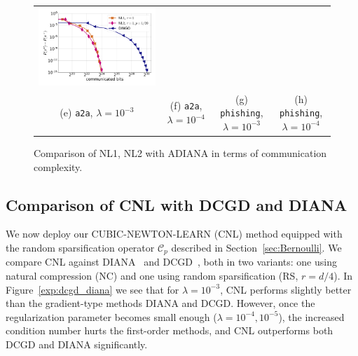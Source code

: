 \documentclass[12pt]{article}
\newcommand{\cC}{{\mathcal{C}}}
\begin{document}
\begin{figure}[ht]
\begin{center}
{\begin{tabular}{cccc}
				\includegraphics[width = 0.23 \textwidth]{LogReg/phishing/Lambda=1e-4/phishing_nl1_nl2_dingo_lmb=0.0001.pdf}
				\\
				(e) {\tt a2a}, $\lambda=10^{-3}$ &(f) {\tt a2a}, $\lambda=10^{-4}$ & (g) {\tt phishing}, $\lambda=10^{-3}$ &(h) {\tt phishing}, $\lambda=10^{-4}$
		\end{tabular}}
		\caption{Comparison of {\sf NL1}, {\sf NL2} with ADIANA in terms of communication complexity.}
		\label{exp:dingo}
	\end{center}
\end{figure}




\subsection{Comparison of {\sf CNL} with  DCGD and DIANA}

We now deploy our {\sf CUBIC-NEWTON-LEARN (CNL)} method equipped with the random sparsification operator $\cC_p$ described in Section~\ref{sec:Bernoulli}. We compare {\sf CNL} against DIANA~\citep{DIANA} and DCGD~\citep{KFJ}, both in two variants: one using natural compression (NC) and one using random sparsification (RS, $r=d/4$). In Figure~\ref{exp:dcgd_diana} we see that for $\lambda=10^{-3}$, {\sf CNL} performs slightly better than the gradient-type methods DIANA and DCGD. However, once the regularization parameter becomes small enough ($\lambda=10^{-4}, 10^{-5}$), the increased condition number hurts the first-order methods, and {\sf CNL} outperforms both DCGD and DIANA significantly.
\end{document}
